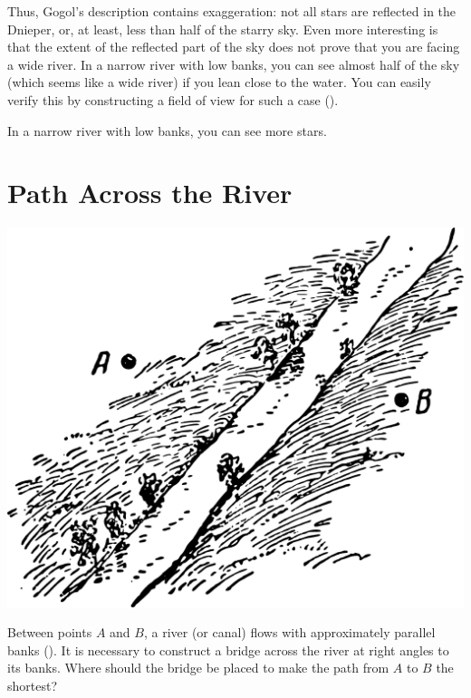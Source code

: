 Thus, Gogol's description contains exaggeration: not all stars are reflected in the Dnieper, or, at least, less than half of the starry sky. Even more interesting is that the extent of the reflected part of the sky does not prove that you are facing a wide river. In a narrow river with low banks, you can see almost half of the sky (which seems like a wide river) if you lean close to the water. You can easily verify this by constructing a field of view for such a case ().


In a narrow river with low banks, you can see more stars.


\section{Path Across the River}
\label{sec-2.17}


\begin{marginfigure}%
\centering
\includegraphics[width=1.\textwidth]{figures/ch-02/fig-056.pdf}
\end{marginfigure}

\ques Between points $A$ and $B$, a river (or canal) flows with approximately parallel banks (). It is necessary to construct a bridge across the river at right angles to its banks. Where should the bridge be placed to make the path from $A$ to $B$ the shortest?



